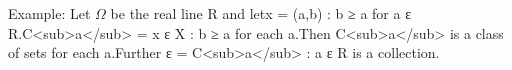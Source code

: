 \documentclass[preview]{standalone}
\begin{document}
\begin{center}
Example: Let $\Omega$ be the real line R and letx = {(a,b) : b ≥ a} for a ε R.C<sub>a</sub> = {x ε X : b ≥ a} for each a.Then C<sub>a</sub> is a class of sets for each a.Further ε = {C<sub>a</sub> : a ε R} is a collection.
\end{center}
\end{document}
